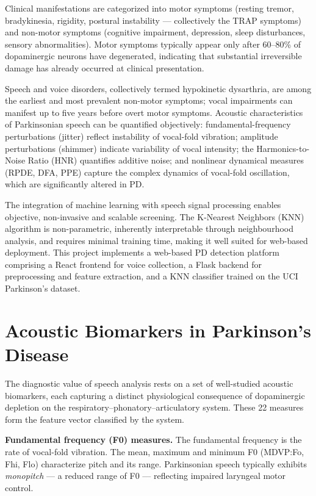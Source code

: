 \documentclass[oneside,a4paper,12pt]{report}
\begin{document}
Clinical manifestations are categorized into motor symptoms (resting tremor,
bradykinesia, rigidity, postural instability --- collectively the TRAP symptoms)
and non-motor symptoms (cognitive impairment, depression, sleep disturbances,
sensory abnormalities). Motor symptoms typically appear only after 60--80\% of
dopaminergic neurons have degenerated, indicating that substantial irreversible
damage has already occurred at clinical presentation.

Speech and voice disorders, collectively termed hypokinetic dysarthria, are among
the earliest and most prevalent non-motor symptoms; vocal impairments can manifest
up to five years before overt motor symptoms. Acoustic characteristics of
Parkinsonian speech can be quantified objectively: fundamental-frequency
perturbations (jitter) reflect instability of vocal-fold vibration; amplitude
perturbations (shimmer) indicate variability of vocal intensity; the
Harmonics-to-Noise Ratio (HNR) quantifies additive noise; and nonlinear
dynamical measures (RPDE, DFA, PPE) capture the complex dynamics of vocal-fold
oscillation, which are significantly altered in PD.

The integration of machine learning with speech signal processing enables
objective, non-invasive and scalable screening. The K-Nearest Neighbors (KNN)
algorithm is non-parametric, inherently interpretable through neighbourhood
analysis, and requires minimal training time, making it well suited for
web-based deployment. This project implements a web-based PD detection platform
comprising a React frontend for voice collection, a Flask backend for
preprocessing and feature extraction, and a KNN classifier trained on the UCI
Parkinson's dataset.

\section{Acoustic Biomarkers in Parkinson's Disease}
The diagnostic value of speech analysis rests on a set of well-studied acoustic
biomarkers, each capturing a distinct physiological consequence of dopaminergic
depletion on the respiratory--phonatory--articulatory system. These 22 measures
form the feature vector classified by the system.

\textbf{Fundamental frequency (F0) measures.} The fundamental frequency is the rate
of vocal-fold vibration. The mean, maximum and minimum F0 (MDVP:Fo, Fhi, Flo)
characterize pitch and its range. Parkinsonian speech typically exhibits
\emph{monopitch} --- a reduced range of F0 --- reflecting impaired laryngeal motor
control.
\end{document}
